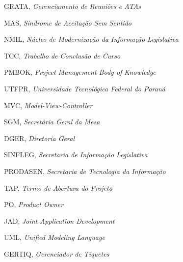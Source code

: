 \begin{siglas}
	\item GRATA, \textit{Gerenciamento de Reuniões e ATAs}
  	\item MAS, \textit{Síndrome de Aceitação Sem Sentido}
  	\item NMIL, \textit{Núcleo de Modernização da Informação Legislativa}
  	\item TCC, \textit{Trabalho de Conclusão de Curso}
  	\item PMBOK, \textit{Project Management Body of Knowledge}
  	\item UTFPR, \textit{Universidade Tecnológica Federal do Paraná}
  	\item MVC, \textit{Model-View-Controller}
  	\item SGM, \textit{Secretária Geral da Mesa}
  	\item DGER, \textit{Diretoria Geral}
  	\item SINFLEG, \textit{Secretaria de Informação Legislativa}
  	\item PRODASEN, \textit{Secretaria de Tecnologia da Informação}
  	\item TAP, \textit{Termo de Abertura do Projeto}
  	\item PO, \textit{Product Owner}
  	\item JAD, \textit{Joint Application Development}
  	\item UML, \textit{Unified Modeling Language}
  	\item GERTIQ, \textit{Gerenciador de Tíquetes}
\end{siglas}